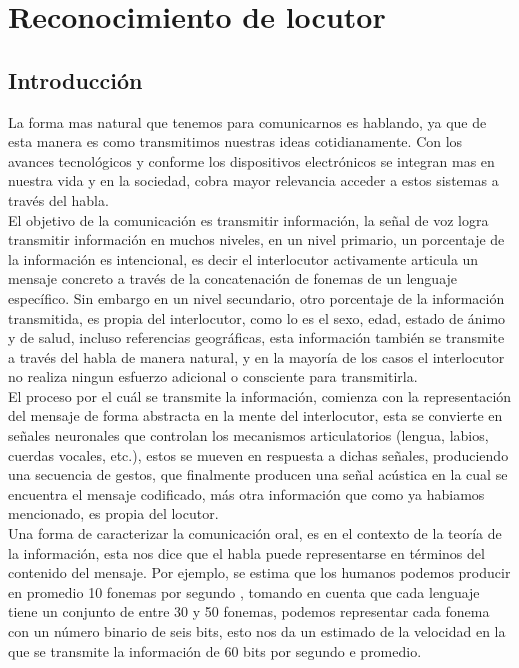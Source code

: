 \chapter{Reconocimiento de locutor} \label{chap:Reconocimiento de locutor}

\section{Introducci\'on}

La forma mas natural que tenemos para comunicarnos es hablando, ya que de esta manera es como transmitimos nuestras ideas cotidianamente. Con los avances tecnol\'ogicos y conforme los dispositivos electr\'onicos se integran mas en nuestra vida y en la sociedad, cobra mayor relevancia acceder a estos sistemas a trav\'es del habla.\\

El objetivo de la comunicaci\'on es transmitir informaci\'on, la señal de voz logra transmitir informaci\'on en muchos niveles, en un nivel primario, un porcentaje de la informaci\'on es intencional, es decir el interlocutor activamente articula un mensaje concreto a trav\'es de la concatenaci\'on de fonemas de un lenguaje espec\'ifico. Sin embargo en un nivel secundario, otro porcentaje de la informaci\'on transmitida, es propia del interlocutor, como lo es el sexo, edad, estado de \'animo y de salud, incluso referencias geogr\'aficas, esta informaci\'on tambi\'en se transmite a trav\'es del habla de manera natural, y en la mayor\'ia de los casos el interlocutor no realiza ningun esfuerzo adicional o consciente para transmitirla.\\

El proceso por el cu\'al se transmite la informaci\'on, comienza con la representaci\'on del mensaje de forma abstracta en la mente del interlocutor, esta se convierte en señales neuronales que controlan los mecanismos articulatorios (lengua, labios, cuerdas vocales, etc.), estos se mueven en respuesta a dichas señales, produciendo una secuencia de gestos, que finalmente producen una señal ac\'ustica en la cual se encuentra el mensaje codificado, m\'as otra informaci\'on que como ya habiamos mencionado, es propia del locutor.\\

Una forma de caracterizar la comunicaci\'on oral, es en el contexto de la teor\'ia de la informaci\'on, esta nos dice que el habla puede representarse en t\'erminos del contenido del mensaje. Por ejemplo, se estima que los humanos podemos producir en promedio 10 fonemas por segundo \cite{rabiner1987}, tomando en cuenta que cada lenguaje tiene un conjunto de entre 30 y 50 fonemas, podemos representar cada fonema con un n\'umero binario de seis bits, esto nos da un estimado de la velocidad en la que se transmite la informaci\'on de 60 bits por segundo e promedio.\\

